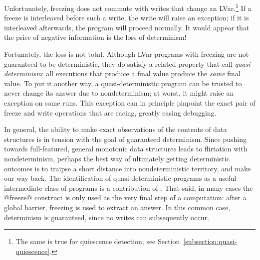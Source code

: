 Unfortunately, freezing does not commute with writes that change an
LVar.\footnote{The same is true for quiescence detection; see
Section~\ref{subsection:quasi-quiescence}.}  If a freeze is
interleaved before such a write, the write will raise an exception; if
it is interleaved afterwards, the program will proceed normally.  It
would appear that the price of negative information is the loss of
determinism!

Fortunately, the loss is not total.  Although LVar programs with
freezing are not guaranteed to be deterministic, they do satisfy a
related property that  call \emph{quasi-determinism}: all executions
that produce a final value produce the \emph{same} final value.  To
put it another way, a quasi-deterministic program can be trusted to
never change its answer due to nondeterminism; at worst, it might
raise an exception on some runs.  This exception can in principle
pinpoint the exact pair of freeze and write operations that are
racing, greatly easing debugging.

In general, the ability to make exact observations of the contents of
data structures is in tension with the goal of guaranteed determinism.
Since pushing towards full-featured, general monotonic data structures
leads to flirtation with nondeterminism, perhaps the best way of
ultimately getting deterministic outcomes is to traipse a short
distance into nondeterministic territory, and make our way back.  The
identification of quasi-deterministic programs as a useful
intermediate class of programs is a contribution of .
That said, in many cases the @freeze@ construct is only used as the
very final step of a computation: after a global barrier, freezing is
used to extract an answer.  In this common case, determinism is
guaranteed, since no writes can subsequently occur.

